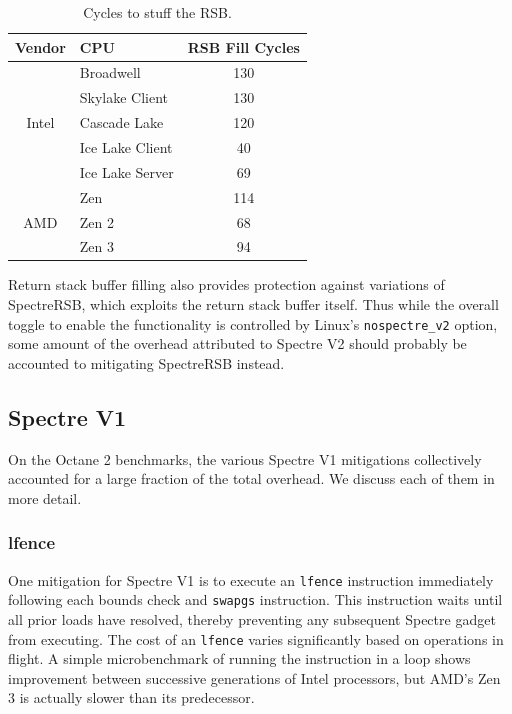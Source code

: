 \begin{table}[h]
  \begin{center}
  \begin{tabular}{clc}
      \textbf{Vendor} & \textbf{CPU} & \textbf{RSB Fill Cycles} \\ \hline
      \multirow{5}{*}{Intel} & Broadwell       & 130 \\
                             & Skylake Client  & 130 \\
                             & Cascade Lake    & 120 \\
                             & Ice Lake Client & 40 \\
                             & Ice Lake Server & 69 \\ \hline
      \multirow{3}{*}{AMD}   & Zen             & 114 \\
                             & Zen 2           & 68 \\
                             & Zen 3           & 94 \\ \hline
  \end{tabular}
  \end{center}
  \caption{Cycles to stuff the RSB. }
  \label{table:rsb-fill}
\end{table}

Return stack buffer filling also provides protection against variations of
SpectreRSB, which exploits the return stack buffer itself.
Thus while the overall toggle to enable the functionality is controlled by Linux's \texttt{nospectre\_v2} option, some amount of the overhead attributed to Spectre V2 should probably be accounted to mitigating SpectreRSB instead.

\subsection{Spectre V1}

On the Octane 2 benchmarks, the various Spectre V1 mitigations collectively accounted for a large fraction of the total overhead.
We discuss each of them in more detail.

\subsubsection{lfence}

One mitigation for Spectre V1 is to execute an \texttt{lfence} instruction immediately following each bounds check and \texttt{swapgs} instruction.
This instruction waits until all prior loads have resolved, thereby preventing any subsequent Spectre gadget from executing.
The cost of an \texttt{lfence} varies significantly based on operations in flight.
A simple microbenchmark of running the instruction in a loop shows improvement between successive generations of Intel processors, but AMD's Zen 3 is actually slower than its predecessor.

